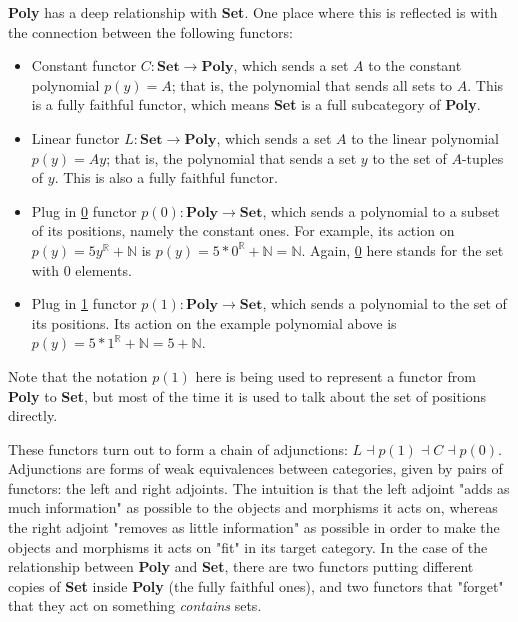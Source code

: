 \textbf{Poly} has a deep relationship with \textbf{Set}. One place where this is reflected is with the connection between the following functors:

\begin{itemize}
    \item Constant functor $C : \textbf{Set} \rightarrow \textbf{Poly}$, which sends a set $A$ to the constant polynomial $p(y) = A$; that is, the polynomial that sends all sets to $A$. This is a fully faithful functor, which means \textbf{Set} is a full subcategory of \textbf{Poly}.
    \item Linear functor $L : \textbf{Set} \rightarrow \textbf{Poly}$,  which sends a set $A$ to the linear polynomial $p(y) = Ay$; that is, the polynomial that sends a set $y$ to the set of $A$-tuples of $y$. This is also a fully faithful functor.
    \item Plug in \underline{0} functor $p(0) : \textbf{Poly} \rightarrow \textbf{Set}$, which sends a polynomial to a subset of its positions, namely the constant ones. For example, its action on $p(y) = 5y^{\mathbb{R}} + \mathbb{N}$ is $p(y) = 5*0^{\mathbb{R}} + \mathbb{N} = \mathbb{N}$. Again, \underline{0} here stands for the set with 0 elements.
    \item Plug in \underline{1} functor $p(1) : \textbf{Poly} \rightarrow \textbf{Set}$, which sends a polynomial to the set of its positions. Its action on the example polynomial above is $p(y) = 5*1^{\mathbb{R}} + \mathbb{N} = 5 + \mathbb{N}$.
\end{itemize}

Note that the notation $p(1)$ here is being used to represent a functor from \textbf{Poly} to \textbf{Set}, but most of the time it is used to talk about the set of positions directly.

These functors turn out to form a chain of adjunctions: $L \dashv p(1) \dashv C \dashv p(0)$. Adjunctions are forms of weak equivalences between categories, given by pairs of functors: the left and right adjoints. The intuition is that the left adjoint "adds as much information" as possible to the objects and morphisms it acts on, whereas the right adjoint "removes as little information" as possible in order to make the objects and morphisms it acts on "fit" in its target category. In the case of the relationship between \textbf{Poly} and \textbf{Set}, there are two functors putting different copies of \textbf{Set} inside \textbf{Poly} (the fully faithful ones), and two functors that "forget" that they act on something \textit{contains} sets. 

